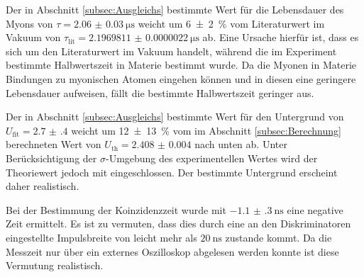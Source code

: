 Der in Abschnitt \ref{subsec:Ausgleichs} bestimmte Wert für die Lebensdauer des Myons von $\tau=\SI{2.06(3)}{\micro\second}$ weicht um \SI{6(2)}{\percent} vom Literaturwert im Vakuum von $\tau_\text{lit}=\SI {2.1969811(22)}{\micro\second}$ \cite{ParticlePhysics}  ab. Eine Ursache hierfür ist, dass es sich um den Literaturwert im Vakuum handelt, während die im Experiment bestimmte Halbwertszeit in Materie bestimmt wurde. Da die Myonen in Materie Bindungen zu myonischen Atomen eingehen können und in diesen eine geringere Lebensdauer aufweisen, fällt die bestimmte Halbwertszeit geringer aus.  %

Der in Abschnitt \ref{subsec:Ausgleichs} bestimmte Wert für den Untergrund von $U_\text{fit}=\num{2.7(4)}$ weicht um \SI{12(13)}{\percent} vom im Abschnitt \ref{subsec:Berechnung} berechneten Wert von $U_\text{th}=\num{2.408(4)}$ nach unten ab. Unter Berücksichtigung der $ \sigma$-Umgebung des experimentellen Wertes wird der Theoriewert jedoch mit eingeschlossen. Der bestimmte Untergrund erscheint daher realistisch.

Bei der Bestimmung der Koinzidenzzeit wurde mit $\SI{-1.1(3)}{\nano\second}$ eine negative Zeit ermittelt. Es ist zu vermuten, dass dies durch eine an den Diskriminatoren eingestellte Impulsbreite von leicht mehr als $\SI{20}{\nano\second}$ zustande kommt. Da die Messzeit nur über ein externes Oszilloskop abgelesen werden konnte ist diese Vermutung realistisch. 




